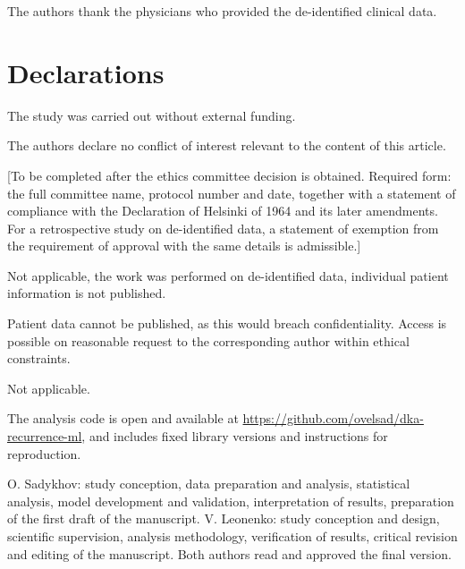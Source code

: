 \documentclass[pdflatex,sn-basic,Numbered]{sn-jnl}
\begin{document}

The authors thank the physicians who provided the de-identified clinical data.

\section*{Declarations}


The study was carried out without external funding.


The authors declare no conflict of interest relevant to the content of this article.


[To be completed after the ethics committee decision is obtained. Required form: the full committee name, protocol number and date, together with a statement of compliance with the Declaration of Helsinki of 1964 and its later amendments. For a retrospective study on de-identified data, a statement of exemption from the requirement of approval with the same details is admissible.]


Not applicable, the work was performed on de-identified data, individual patient information is not published.


Patient data cannot be published, as this would breach confidentiality. Access is possible on reasonable request to the corresponding author within ethical constraints.


Not applicable.


The analysis code is open and available at \url{https://github.com/ovelsad/dka-recurrence-ml}, and includes fixed library versions and instructions for reproduction.


O. Sadykhov: study conception, data preparation and analysis, statistical analysis, model development and validation, interpretation of results, preparation of the first draft of the manuscript. V. Leonenko: study conception and design, scientific supervision, analysis methodology, verification of results, critical revision and editing of the manuscript. Both authors read and approved the final version.
\end{document}
